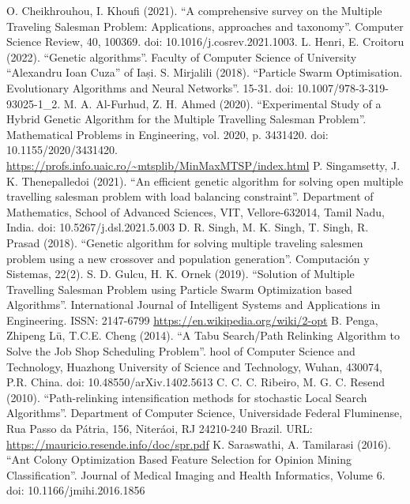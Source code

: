 \documentclass[conference]{IEEEtran}
\begin{document}
\begin{thebibliography}{00}
     O. Cheikhrouhou, I. Khoufi (2021). ``A comprehensive survey on the Multiple Traveling Salesman Problem: Applications, approaches and taxonomy''. Computer Science Review, 40, 100369. doi: 10.1016/j.cosrev.2021.1003.
     L. Henri, E. Croitoru (2022). ``Genetic algorithms''. Faculty of Computer Science of University ``Alexandru Ioan Cuza'' of Iași.
     S. Mirjalili (2018). ``Particle Swarm Optimisation. Evolutionary Algorithms and Neural Networks''. 15-31. doi: 10.1007/978-3-319-93025-1\_2.
     M. A. Al-Furhud, Z. H. Ahmed (2020). ``Experimental Study of a Hybrid Genetic Algorithm for the Multiple Travelling Salesman Problem''. Mathematical Problems in Engineering, vol. 2020, p. 3431420. doi: 10.1155/2020/3431420.
     \url{https://profs.info.uaic.ro/~mtsplib/MinMaxMTSP/index.html}
     P. Singamsetty, J. K. Thenepalledoi (2021). ``An efficient genetic algorithm for solving open multiple travelling salesman problem with load balancing constraint''. Department of Mathematics, School of Advanced Sciences, VIT, Vellore-632014, Tamil Nadu, India. doi: 10.5267/j.dsl.2021.5.003
     D. R. Singh, M. K. Singh, T. Singh, R. Prasad (2018). ``Genetic algorithm for solving multiple traveling salesmen problem using a new crossover and population generation''. Computación y Sistemas, 22(2).
     S. D. Gulcu, H. K. Ornek (2019). ``Solution of Multiple Travelling Salesman Problem using Particle Swarm Optimization based Algorithms''. International Journal of Intelligent Systems and Applications in Engineering. ISSN: 2147-6799
     \url{https://en.wikipedia.org/wiki/2-opt}
     B. Penga, Zhipeng Lü, T.C.E. Cheng (2014). ``A Tabu Search/Path Relinking Algorithm to Solve the Job Shop Scheduling Problem''. hool of Computer Science and Technology, Huazhong University of Science and Technology, Wuhan, 430074, P.R. China. doi: 10.48550/arXiv.1402.5613
     C. C. C. Ribeiro, M. G. C. Resend (2010). ``Path-relinking intensification methods for stochastic Local Search Algorithms''. Department of Computer Science, Universidade Federal Fluminense, Rua Passo da Pátria, 156, Niteráoi, RJ 24210-240 Brazil. URL: \url{https://mauricio.resende.info/doc/spr.pdf}
     K. Saraswathi, A. Tamilarasi (2016). ``Ant Colony Optimization Based Feature Selection for Opinion Mining Classification''.  Journal of Medical Imaging and Health Informatics, Volume 6. doi: 10.1166/jmihi.2016.1856
\end{thebibliography}
\end{document}
